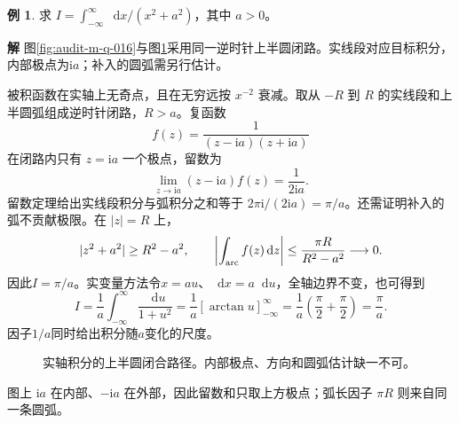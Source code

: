 \documentclass[11pt,openany,fontset=fandol]{ctexbook}
\theoremstyle{plain}\newtheorem{theorem}{定理}[chapter]\newtheorem{proposition}[theorem]{命题}
\theoremstyle{definition}\newtheorem{definition}{定义}[chapter]\newtheorem{example}{例}[chapter]
\theoremstyle{remark}\newtheorem*{remark}{说明}
\newcommand{\SolutionStart}{\par\nobreak\medskip\nobreak\noindent\textbf{解}\quad\ignorespaces}
\newenvironment{solution}{\SolutionStart}{\par\medskip}
\newcommand{\dd}{\mathop{}\!\mathrm d}\newcommand{\ii}{\mathrm i}\newcommand{\ee}{\mathrm e}
\begin{document}
\begin{example}
求 $I=\int_{-\infty}^{\infty}\dd x/(x^2+a^2)$，其中 $a>0$。
\end{example}

\begin{solution}
图\ref{fig:audit-m-q-016}与图\ref{fig:orig-014}采用同一逆时针上半圆闭路。实线段对应目标积分，内部极点为$\ii a$；补入的圆弧需另行估计。

被积函数在实轴上无奇点，且在无穷远按 $x^{-2}$ 衰减。取从 $-R$ 到 $R$ 的实线段和上半圆弧组成逆时针闭路，$R>a$。复函数
\[
f(z)=\frac1{(z-\ii a)(z+\ii a)}
\]
在闭路内只有 $z=\ii a$ 一个极点，留数为
\[
\lim_{z\to\ii a}(z-\ii a)f(z)=\frac1{2\ii a}.
\]
留数定理给出实线段积分与弧积分之和等于 $2\pi\ii/(2\ii a)=\pi/a$。还需证明补入的弧不贡献极限。在 $|z|=R$ 上，
\[
|z^2+a^2|\ge R^2-a^2,
\qquad\left|\int_{\rm arc}f(z)\dd z\right|
\le\frac{\pi R}{R^2-a^2}\longrightarrow0.
\]
因此$I=\pi/a$。实变量方法令$x=au$、$\dd x=a\dd u$，全轴边界不变，也可得到
\[I=\frac1a\int_{-\infty}^{\infty}\frac{\dd u}{1+u^2}
=\frac1a[\arctan u]_{-\infty}^{\infty}
=\frac1a\left(\frac\pi2+\frac\pi2\right)=\frac\pi a.\]
因子$1/a$同时给出积分随$a$变化的尺度。

\begin{figure}[H]\centering
{}
\caption{实轴积分的上半圆闭合路径。内部极点、方向和圆弧估计缺一不可。}
\label{fig:orig-014}
\end{figure}

图上 $\ii a$ 在内部、$-\ii a$ 在外部，因此留数和只取上方极点；弧长因子 $\pi R$ 则来自同一条圆弧。
\end{solution}
\end{document}
